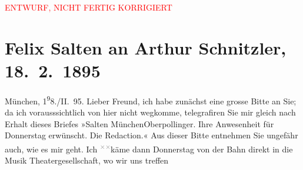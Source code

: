 
\begin{center}
            \textcolor{red}{ENTWURF, NICHT FERTIG KORRIGIERT}
                      \end{center}
            
         
         \renewcommand{\erwaehntePersonen}{Personen: Hermann Bahr, Richard Beer-Hofmann, Otto Brahm, Julius von Gans-Ludassy, Hugo von Hofmannsthal, Maria Charlotte Lamberg, Charlotte Pohl-Glas}
         \renewcommand{\erwaehnteInstitutionen}{Institutionen: Deutsches Theater Berlin, Wiener Musik- und Theatergesellschaft}
         \renewcommand{\erwaehnteOrte}{Orte: Hotel Oberpollinger, München, Wien}
         \renewcommand{\erwaehnteWerke}{Werke: Adele Sandrock, Die Zeit. Wiener Wochenschrift, Liebelei. Schauspiel in drei Akten}
               \section[Felix Salten an Arthur Schnitzler, 18. 2. 1895]{ Felix Salten an Arthur Schnitzler, 18. 2. 1895}\nopagebreak{}\rehead{ }\begin{ledgroupsized}[t]{13cm}\normalsize\beginnumbering \toendnotes[C]{\smallbreak\pagebreak[2]} 
\toendnotes[C]{\smallbreak}\pstart
           \raggedleft{}{\pb}München, 1\substVorne{}\textsuperscript{9}\substDazwischen{}8\substHinten{}./II. 95.\pend
           \pstart
           Lieber Freund, ich habe zunächst eine grosse Bitte an Sie; da ich
               vorausssichtlich von hier nicht wegkomme, telegrafiren Sie mir gleich nach Erhalt
               dieses Briefes »Salten MünchenOberpollinger. Ihre Anwesenheit für Donnerstag
               erwünscht. Die Redaction.« \pend
           \pstart
           Aus dieser Bitte entnehmen Sie ungefähr auch, wie es mir geht. Ich \substVorne{}\textsuperscript{\textcolor{gray}{×}\-\textcolor{gray}{×}}\substDazwischen{}kä\substHinten{}me dann Donnerstag von der Bahn direkt in die Musik {\kaufmannsund} Theatergesellschaft, wo wir uns treffen

\end{ledgroupsized}

